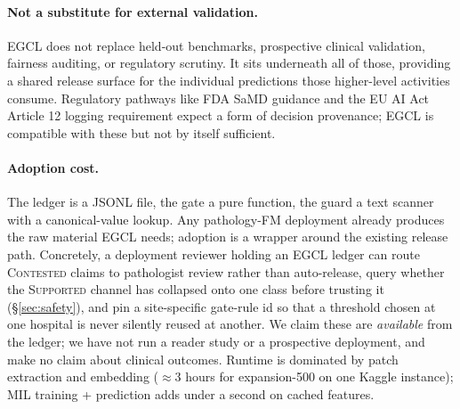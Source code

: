 \documentclass{article}
\newcommand{\SafeNum}[1]{#1}
\begin{document}
\paragraph{Not a substitute for external validation.} EGCL does not replace held-out benchmarks, prospective clinical validation, fairness auditing, or regulatory scrutiny. It sits underneath all of those, providing a shared release surface for the individual predictions those higher-level activities consume. Regulatory pathways like FDA SaMD guidance and the EU AI Act Article 12 logging requirement expect a form of decision provenance; EGCL is compatible with these but not by itself sufficient.

\paragraph{Adoption cost.} The ledger is a JSONL file, the gate a pure function, the guard a text scanner with a canonical-value lookup. Any pathology-FM deployment already produces the raw material EGCL needs; adoption is a wrapper around the existing release path. Concretely, a deployment reviewer holding an EGCL ledger can route \textsc{Contested} claims to pathologist review rather than auto-release, query whether the \textsc{Supported} channel has collapsed onto one class before trusting it (\S\ref{sec:safety}), and pin a site-specific gate-rule id so that a threshold chosen at one hospital is never silently reused at another. We claim these are \emph{available} from the ledger; we have not run a reader study or a prospective deployment, and make no claim about clinical outcomes. Runtime is dominated by patch extraction and embedding ($\approx \SafeNum{3}$ hours for expansion-500 on one Kaggle instance); MIL training + prediction adds under a second on cached features.
\end{document}
